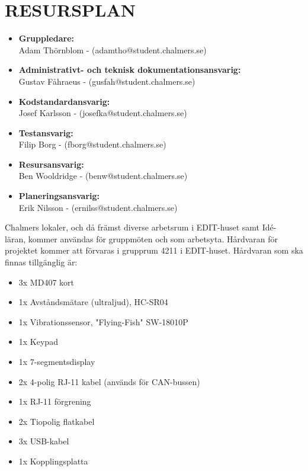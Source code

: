 \documentclass[a4paper]{article}
\begin{document}
\section{RESURSPLAN}
\label{sec:resurs}

\begin{itemize}
    \item \textbf{Gruppledare:}
    \\
    Adam Thörnblom - (adamtho@student.chalmers.se)
    
    \item \textbf{Administrativt- och teknisk dokumentationsansvarig:} 
    \\
    Gustav Fåhraeus - (gusfah@student.chalmers.se)

    \item \textbf{Kodstandardansvarig:}
    \\
    Josef Karlsson - (josefka@student.chalmers.se)

    \item \textbf{Testansvarig:}
    \\
    Filip Borg - (fborg@student.chalmers.se) 

    \item \textbf{Resursansvarig:} 
    \\
    Ben Wooldridge - (benw@student.chalmers.se)

    \item \textbf{Planeringsansvarig:}
    \\
    Erik Nilsson - (ernilss@student.chalmers.se) 
\end{itemize}

Chalmers lokaler, och då främst diverse arbetsrum i EDIT-huset samt Idé-\\läran, kommer användas för gruppmöten och som arbetsyta. Hårdvaran för projektet kommer att förvaras i grupprum 4211 i EDIT-huset. Hårdvaran som ska finnas tillgänglig är:
\begin{itemize}
    \item 3x MD407 kort 
    \item 1x Avståndsmätare (ultraljud), HC-SR04 
    \item 1x Vibrationssensor, "Flying-Fish" SW-18010P 
    \item 1x Keypad 
    \item 1x 7-segmentsdisplay 
    \item 2x 4-polig RJ-11 kabel (används för CAN-bussen) 
    \item 1x RJ-11 förgrening
    \item 2x Tiopolig flatkabel 
    \item 3x USB-kabel 
    \item 1x Kopplingsplatta
\end{itemize}
\end{document}
